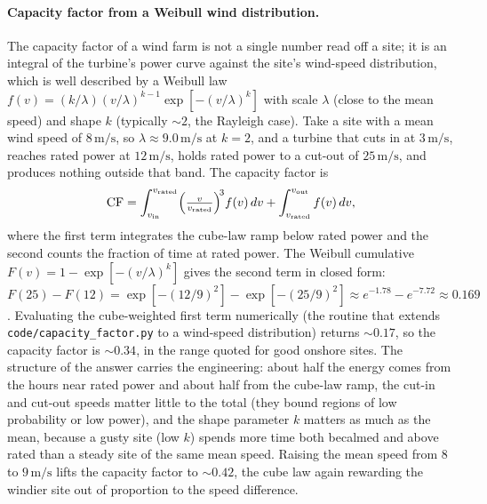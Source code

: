 \paragraph{Capacity factor from a Weibull wind distribution.} The capacity
factor of a wind farm is not a single number read off a site; it is an
integral of the turbine's power curve against the site's wind-speed
distribution, which is well described by a Weibull law
$f(v) = (k/\lambda)(v/\lambda)^{k-1}\exp[-(v/\lambda)^k]$ with scale
$\lambda$ (close to the mean speed) and shape $k$ (typically $\sim 2$,
the Rayleigh case). Take a site with a mean wind speed of $8\,\si{\meter
\per\second}$, so $\lambda \approx 9.0\,\si{\meter\per\second}$ at $k = 2$,
and a turbine that cuts in at $3\,\si{\meter\per\second}$, reaches rated
power at $12\,\si{\meter\per\second}$, holds rated power to a cut-out of
$25\,\si{\meter\per\second}$, and produces nothing outside that band. The
capacity factor is
\[
\text{CF} = \int_{v_{\text{in}}}^{v_{\text{rated}}}
  \Bigl(\tfrac{v}{v_{\text{rated}}}\Bigr)^{\!3} f(v)\,dv
  + \int_{v_{\text{rated}}}^{v_{\text{out}}} f(v)\,dv,
\]
where the first term integrates the cube-law ramp below rated power and the
second counts the fraction of time at rated power. The Weibull cumulative
$F(v) = 1 - \exp[-(v/\lambda)^k]$ gives the second term in closed form:
$F(25) - F(12) = \exp[-(12/9)^2] - \exp[-(25/9)^2] \approx e^{-1.78} -
e^{-7.72} \approx 0.169$. Evaluating the cube-weighted first term
numerically (the routine that extends \texttt{code/capacity\_factor.py}
to a wind-speed distribution) returns $\sim 0.17$, so the capacity factor
is $\sim 0.34$, in the range quoted for good onshore sites. The structure
of the answer carries the engineering: about half the energy comes from the
hours near rated power and about half from the cube-law ramp, the cut-in
and cut-out speeds matter little to the total (they bound regions of low
probability or low power), and the shape parameter $k$ matters as much as
the mean, because a gusty site (low $k$) spends more time both becalmed and
above rated than a steady site of the same mean speed. Raising the mean
speed from $8$ to $9\,\si{\meter\per\second}$ lifts the capacity factor to
$\sim 0.42$, the cube law again rewarding the windier site out of
proportion to the speed difference.

